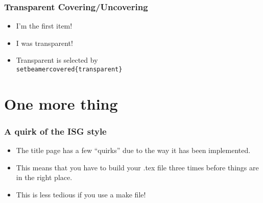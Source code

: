 \documentclass[aspectratio=169]{beamer} %
\begin{document}
\begin{frame}\frametitle{Transparent Covering/Uncovering}
\begin{itemize}
	\item I'm the first item!
	\pause
	\item I was transparent!
	\pause
	\item Transparent is selected by \texttt{\\setbeamercovered\{transparent\}}
\end{itemize}
\end{frame}

\section{One more thing}
\begin{frame}\frametitle{A quirk of the ISG style}
\begin{itemize}
	\item The title page has a few ``quirks'' due to the way it has been implemented.
	\item This means that you have to build your .tex file three times before things are in the right place.
	\item This is less tedious if you use a make file!
\end{itemize}
\end{frame}
\end{document}
